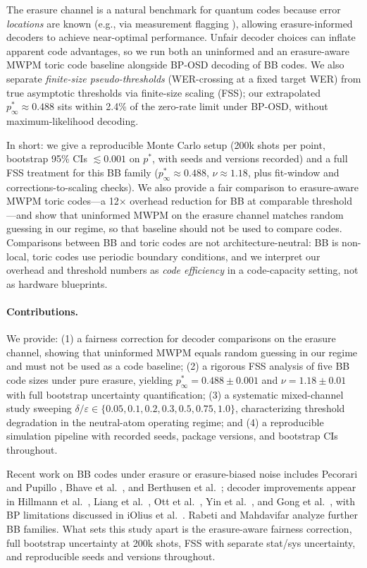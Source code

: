 \documentclass[a4paper]{quantumarticle}
\begin{document}
The erasure channel is a natural benchmark for quantum codes because error \emph{locations} are
known (e.g., via measurement flagging \cite{grassl2004codes}), allowing erasure-informed decoders
to achieve near-optimal performance.
Unfair decoder choices can inflate apparent code advantages, so we run both an uninformed
and an erasure-aware MWPM toric code baseline alongside BP-OSD decoding of BB codes.
We also separate \emph{finite-size pseudo-thresholds} (WER-crossing at a fixed target WER)
from true asymptotic thresholds via finite-size scaling (FSS); our extrapolated
$p^*_\infty \approx 0.488$ sits within 2.4\% of the zero-rate limit under BP-OSD, without
maximum-likelihood decoding.

In short: we give a reproducible Monte Carlo setup (200k shots per point, bootstrap 95\%
CIs $\lesssim 0.001$ on $p^*$, with seeds and versions recorded) and a full FSS treatment
for this BB family ($p^*_\infty \approx 0.488$, $\nu \approx 1.18$, plus fit-window and
corrections-to-scaling checks).
We also provide a fair comparison to erasure-aware MWPM toric codes---a 12$\times$
overhead reduction for BB at comparable threshold---and show that uninformed MWPM on the
erasure channel matches random guessing in our regime, so that baseline should not be
used to compare codes.
Comparisons between BB and toric codes are not architecture-neutral: BB is non-local,
toric codes use periodic boundary conditions, and we interpret our overhead and threshold
numbers as \emph{code efficiency} in a code-capacity setting, not as hardware blueprints.

\paragraph{Contributions.}
We provide: (1) a fairness correction for decoder comparisons on the erasure channel,
showing that uninformed MWPM equals random guessing in our regime and must not be used
as a code baseline; (2) a rigorous FSS analysis of five BB code sizes under pure erasure,
yielding $p^*_\infty = 0.488 \pm 0.001$ and $\nu = 1.18 \pm 0.01$ with full bootstrap
uncertainty quantification; (3) a systematic mixed-channel study sweeping
$\delta/\varepsilon \in \{0.05, 0.1, 0.2, 0.3, 0.5, 0.75, 1.0\}$, characterizing threshold
degradation in the neutral-atom operating regime; and (4) a reproducible simulation
pipeline with recorded seeds, package versions, and bootstrap CIs throughout.

Recent work on BB codes under erasure or erasure-biased noise includes
Pecorari and Pupillo \cite{pecorari2025qldpc}, Bhave et al.\ \cite{bhave2026bibi}, and
Berthusen et al.\ \cite{berthusen2025local}; decoder improvements appear in
Hillmann et al.\ \cite{hillmann2025lsd}, Liang et al.\ \cite{liang2025bposd},
Ott et al.\ \cite{ott2025decision}, Yin et al.\ \cite{yin2024symmetry}, and
Gong et al.\ \cite{gong2024bpdecoding}, with BP limitations discussed in
iOlius et al.\ \cite{iolius2024bp}.
Rabeti and Mahdavifar \cite{rabeti2025bicycle} analyze further BB families.
What sets this study apart is the erasure-aware fairness correction, full bootstrap
uncertainty at 200k shots, FSS with separate stat/sys uncertainty, and reproducible
seeds and versions throughout.
\end{document}
